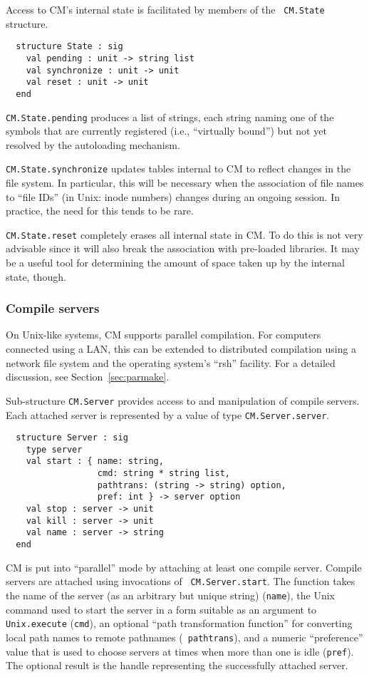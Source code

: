 \documentclass[titlepage,letterpaper]{article}
\begin{document}
Access to CM's internal state is facilitated by members of the {\tt
CM.State} structure.

\begin{verbatim}
  structure State : sig
    val pending : unit -> string list
    val synchronize : unit -> unit
    val reset : unit -> unit
  end
\end{verbatim}

{\tt CM.State.pending} produces a list of strings, each string naming
one of the symbols that are currently registered (i.e., ``virtually
bound'') but not yet resolved by the autoloading mechanism.

{\tt CM.State.synchronize} updates tables internal to CM to reflect
changes in the file system.  In particular, this will be necessary
when the association of file names to ``file IDs'' (in Unix: inode
numbers) changes during an ongoing session.  In practice, the need for
this tends to be rare.

{\tt CM.State.reset} completely erases all internal state in CM.  To
do this is not very advisable since it will also break the association
with pre-loaded libraries.  It may be a useful tool for determining
the amount of space taken up by the internal state, though.

\subsubsection*{Compile servers}

On Unix-like systems, CM supports parallel compilation.  For computers
connected using a LAN, this can be extended to distributed compilation
using a network file system and the operating system's ``rsh''
facility.  For a detailed discussion, see Section~\ref{sec:parmake}.

Sub-structure {\tt CM.Server} provides access to and manipulation of
compile servers.  Each attached server is represented by a value of
type {\tt CM.Server.server}.

\begin{verbatim}
  structure Server : sig
    type server
    val start : { name: string,
                  cmd: string * string list,
                  pathtrans: (string -> string) option,
                  pref: int } -> server option
    val stop : server -> unit
    val kill : server -> unit
    val name : server -> string
  end
\end{verbatim}

CM is put into ``parallel'' mode by attaching at least one compile
server.  Compile servers are attached using invocations of {\tt
CM.Server.start}.  The function takes the name of the server (as an
arbitrary but unique string) ({\tt name}), the Unix command used to
start the server in a form suitable as an argument to {\tt
Unix.execute} ({\tt cmd}), an optional ``path transformation
function'' for converting local path names to remote pathnames ({\tt
pathtrans}), and a numeric ``preference'' value that is used to choose
servers at times when more than one is idle ({\tt pref}).  The
optional result is the handle representing the successfully attached
server.
\end{document}
